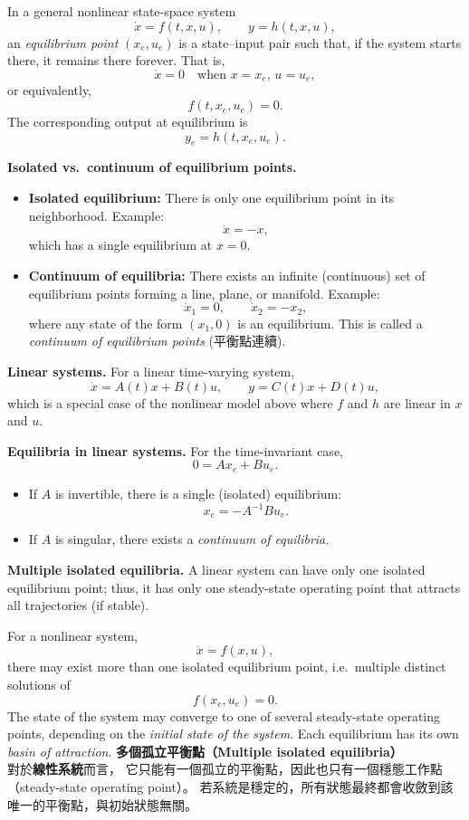 \documentclass{article}
\begin{document}
\noindent
In a general nonlinear state-space system
\[
\dot{x} = f(t, x, u), \qquad y = h(t, x, u),
\]
an \emph{equilibrium point} $(x_e, u_e)$ is a state–input pair such that, if the system starts there, it remains there forever.  
That is,
\[
\dot{x} = 0 \quad \text{when } x = x_e,\, u = u_e,
\]
or equivalently,
\[
f(t, x_e, u_e) = 0.
\]
The corresponding output at equilibrium is
\[
y_e = h(t, x_e, u_e).
\]

\bigskip
\noindent
\textbf{Isolated vs.\ continuum of equilibrium points.}
\begin{itemize}
  \item \textbf{Isolated equilibrium:} There is only one equilibrium point in its neighborhood.  
  Example:
  \[
  \dot{x} = -x,
  \]
  which has a single equilibrium at $x=0$.
  
  \item \textbf{Continuum of equilibria:} There exists an infinite (continuous) set of equilibrium points forming a line, plane, or manifold.  
  Example:
  \[
  \dot{x}_1 = 0, \qquad \dot{x}_2 = -x_2,
  \]
  where any state of the form $(x_1, 0)$ is an equilibrium.  
  This is called a \emph{continuum of equilibrium points} (平衡點連續).
\end{itemize}

\bigskip
\noindent
\textbf{Linear systems.}
For a linear time-varying system,
\[
\dot{x} = A(t)x + B(t)u, \qquad y = C(t)x + D(t)u,
\]
which is a special case of the nonlinear model above where $f$ and $h$ are linear in $x$ and $u$.

\bigskip
\noindent
\textbf{Equilibria in linear systems.}
For the time-invariant case,
\[
0 = A x_e + B u_e.
\]
\begin{itemize}
  \item If $A$ is invertible, there is a single (isolated) equilibrium:
  \[
  x_e = -A^{-1} B u_e.
  \]
  \item If $A$ is singular, there exists a \emph{continuum of equilibria.}
\end{itemize}
\noindent
\textbf{Multiple isolated equilibria.}
A linear system can have only one isolated equilibrium point; thus, it has only one steady-state operating point that attracts all trajectories (if stable).

\bigskip
\noindent
For a nonlinear system,
\[
\dot{x} = f(x, u),
\]
there may exist more than one isolated equilibrium point, i.e.\ multiple distinct solutions of
\[
f(x_e, u_e) = 0.
\]
The state of the system may converge to one of several steady-state operating points,
depending on the \emph{initial state of the system}.
Each equilibrium has its own \emph{basin of attraction}.
\noindent
\textbf{多個孤立平衡點（Multiple isolated equilibria）} \\[4pt]
對於\textbf{線性系統}而言，
它只能有一個孤立的平衡點，因此也只有一個穩態工作點（steady-state operating point）。
若系統是穩定的，所有狀態最終都會收斂到該唯一的平衡點，與初始狀態無關。
\end{document}
